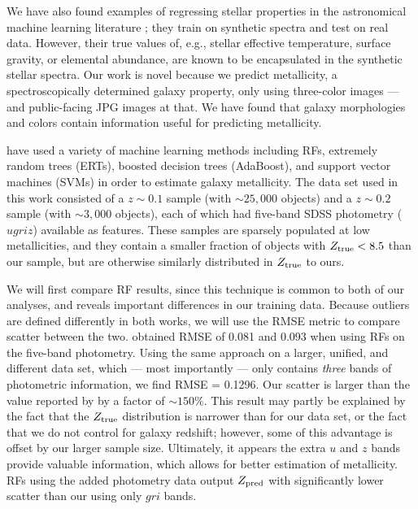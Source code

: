\documentclass[fleqn,usenatbib]{mnras}
\begin{document}
We have also found examples of regressing stellar properties in the astronomical machine learning literature \citep[see, e.g.,][]{2000A&A...357..197B,2018MNRAS.475.2978F}; they train on synthetic spectra and test on real data.
However, their true values of, e.g., stellar effective temperature, surface gravity, or elemental abundance, are known to be encapsulated in the synthetic stellar spectra.
Our work is novel because we predict metallicity, a spectroscopically determined galaxy property, only using three-color images --- and public-facing JPG images at that.
We have found that galaxy morphologies and colors contain information useful for predicting metallicity.


\cite{2016MNRAS.456.1618A} have used a variety of machine learning methods including RFs, extremely random trees (ERTs), boosted decision trees (AdaBoost), and support vector machines (SVMs) in order to estimate galaxy metallicity.
The data set used in this work consisted of a $z \sim 0.1$ sample (with $\sim 25,000$ objects) and a $z \sim 0.2$ sample (with $\sim 3,000$ objects), each of which had five-band SDSS photometry ($ugriz$) available as features.
These samples are sparsely populated at low metallicities, and they contain a smaller fraction of objects with $Z_{\rm true} < 8.5$ than our sample, but are otherwise similarly distributed in $Z_{\rm true}$ to ours.

We will first compare RF results, since this technique is common to both of our analyses, and reveals important differences in our training data.
Because outliers are defined differently in both works, we will use the RMSE metric to compare scatter between the two.
\cite{2016MNRAS.456.1618A} obtained RMSE of 0.081 and 0.093 when using RFs on the five-band photometry.
Using the same approach on a larger, unified, and different data set, which --- most importantly --- only contains \textit{three} bands of photometric information, we find RMSE = 0.1296.
Our scatter is larger than the value reported by \cite{2016MNRAS.456.1618A} by a factor of $\sim 150\%$.
This result may partly be explained by the fact that the $Z_{\rm true}$ distribution is narrower than for our data set, or the fact that we do not control for galaxy redshift; however, some of this advantage is offset by our larger sample size.
Ultimately, it appears the extra $u$ and $z$ bands provide valuable information, which allows for better estimation of metallicity.
RFs using the added photometry data output $Z_{\rm pred}$ with significantly lower scatter than our using only $gri$ bands.
\end{document}
